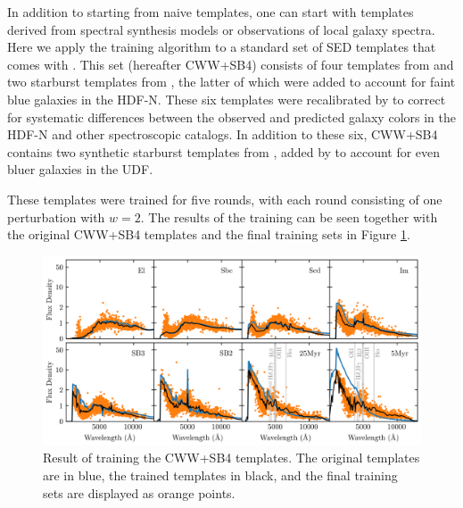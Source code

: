 In addition to starting from naive templates, one can start with templates derived from spectral synthesis models or observations of local galaxy spectra. 
Here we apply the training algorithm to a standard set of SED templates that comes with \bpz.
This set (hereafter CWW+SB4) consists of four templates from \citet{Coleman1980a} and two starburst templates from \citet{Kinney1996a}, the latter of which were added to account for faint blue galaxies in the HDF-N. 
These six templates were recalibrated by \citet{Benitez2004a} to correct for systematic differences between the observed and predicted galaxy colors in the HDF-N and other spectroscopic catalogs. 
In addition to these six, CWW+SB4 contains two synthetic starburst templates from \citet{Bruzual2003b}, added by \citet{Coe2006a} to account for even bluer galaxies in the UDF.

These templates were trained for five rounds, with each round consisting of one perturbation with $w=2$. 
The results of the training can be seen together with the original CWW+SB4 templates and the final training sets in Figure \ref{fig:cwwsb4_trained}. 

\begin{figure}
    \centering
    \includegraphics{figures/cwwsb4_trained.png}
    \caption{Result of training the CWW+SB4 templates. The original templates are in blue, the trained templates in black, and the final training sets are displayed as orange points.}
    \label{fig:cwwsb4_trained}
\end{figure}


